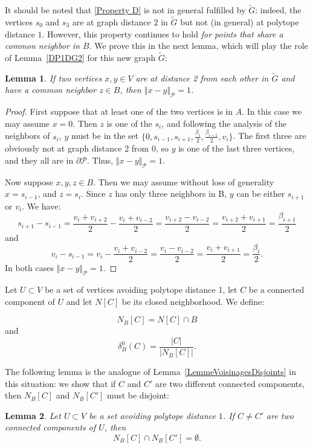 \documentclass{amsart}                     %
\newtheorem{lemm}{Lemma}
\newcommand{\lref}[1]{Lemma~\textup{\ref{#1}}}
\begin{document}
It should be noted that \eqref{Property D} is not in general fulfilled by $\tilde{G}$: indeed, the vertices $s_0$ and $s_3$ are at graph distance $2$ in $\tilde{G}$  but not (in general) at polytope distance $1$. However, this property continues to hold \emph{for points that share a common neighbor in $B$}. We prove this in the next  lemma, which  will play the role of \lref{DP1DG2} for this new graph $\tilde{G}$:

\begin{lemm}\label{DP1DG2HexaIrreg}
If two vertices $x,y\in V$ are at distance 2 from each other in $\tilde{G}$ and have a common neighbor $z\in B$, then $\Vert  x-y\Vert  _\mathcal{P}=1$.
\end{lemm}

\begin{proof}
First suppose that at least one of the two vertices is in $A$. In this case we may assume $x=0$. Then $z$ is one of the $s_i$, and following the analysis of the neighbors of $s_i$, $y$ must be in the set $\{ 0, s_{i-1}, s_{i+1}, \frac{ \beta_{i} }{2}, \frac{ \beta_{i-1} }{2}, v_i\}$. The first three are obviously not at graph distance $2$ from $0$, so $y$ is one of the last three vertices, and they all are in $\partial \mathcal{P}$. Thus, $\Vert  x-y\Vert  _\mathcal{P}=1$.

Now suppose $x,y,z\in B$. Then we may assume without loss of generality $x=s_{i-1}$, and $z=s_{i}$. Since $z$ has only three neighbors in B, $y$ can be either $s_{i+1}$ or $v_i$. We have:
$$s_{i+1} -s_{i-1} =\frac{v_{i}+v_{i+2}}{2} - \frac{v_{i}+v_{i-2}}{2} = \frac{v_{i+2}-v_{i-2}}{2} = \frac{v_{i+2}+v_{i+1}}{2} = \frac{\beta_{i+1}}{2}  $$ 
and
$$v_{i} -s_{i-1} =v_{i} - \frac{v_{i}+v_{i-2}}{2} = \frac{v_{i}-v_{i-2}}{2} = \frac{v_{i}+v_{i+1}}{2} = \frac{\beta_{i}}{2}. $$
In both cases $\Vert  x-y\Vert  _\mathcal{P}=1$. 
\end{proof}



Let $U\subset V$ be a set of vertices avoiding polytope distance 1, let $C$ be a connected component of $U$ and let $N[C]$ be its closed neighborhood. We define:

$$ N_B[C] = N[C]\cap B $$
and 
$${\delta}^0_B(C)=\frac{|C|}{|N_B[C]|}.$$

The following lemma is the analogue of \lref{LemmeVoisinagesDisjoints} in this situation: we show that if $C$ and $C'$ are two different connected components, then $N_B[C]$ and $N_B[C']$ must be disjoint:
\begin{lemm}\label{HexaIrregVoisDisjoints}
Let $U\subset V$ be a set avoiding polytope distance $1$. If $C\neq C'$ are two connected  components of $U$, then
$$ N_B[C]\cap N_B[C'] =\emptyset. $$
\end{lemm}
\end{document}
